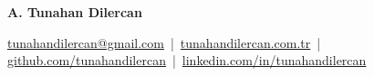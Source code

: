 \documentclass[11pt]{article}       %
\begin{document}
\centerline{\fontsize{24}{28}\selectfont \textbf{A. Tunahan Dilercan}}



\vspace{10pt}


{\small
\centerline{%
  \href{mailto:tunahandilercan@gmail.com}{tunahandilercan@gmail.com} \,|\, 
  \href{https://tunahandilercan.com.tr}{tunahandilercan.com.tr} \,|\, 
  \href{https://github.com/tunahandilercan}{github.com/tunahandilercan} \,|\, 
  \href{https://linkedin.com/in/tunahandilercan}{linkedin.com/in/tunahandilercan}%
}}

\end{document}
